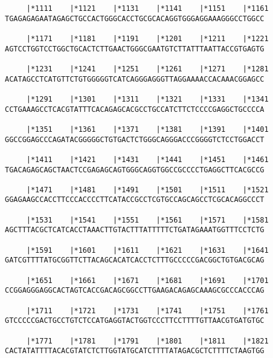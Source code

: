 \documentclass{article}
\begin{document}
\begin{Verbatim}
     |*1111    |*1121    |*1131    |*1141    |*1151    |*1161
TGAGAGAGAATAGAGCTGCCACTGGGCACCTGCGCACAGGTGGGAGGAAAGGGCCTGGCC
                                                            
     |*1171    |*1181    |*1191    |*1201    |*1211    |*1221
AGTCCTGGTCCTGGCTGCACTCTTGAACTGGGCGAATGTCTTATTTAATTACCGTGAGTG
                                                            
     |*1231    |*1241    |*1251    |*1261    |*1271    |*1281
ACATAGCCTCATGTTCTGTGGGGGTCATCAGGGAGGGTTAGGAAAACCACAAACGGAGCC
                                                            
     |*1291    |*1301    |*1311    |*1321    |*1331    |*1341
CCTGAAAGCCTCACGTATTTCACAGAGCACGCCTGCCATCTTCTCCCCGAGGCTGCCCCA
                                                            
     |*1351    |*1361    |*1371    |*1381    |*1391    |*1401
GGCCGGAGCCCAGATACGGGGGCTGTGACTCTGGGCAGGGACCCGGGGTCTCCTGGACCT
                                                            
     |*1411    |*1421    |*1431    |*1441    |*1451    |*1461
TGACAGAGCAGCTAACTCCGAGAGCAGTGGGCAGGTGGCCGCCCCTGAGGCTTCACGCCG
                                                            
     |*1471    |*1481    |*1491    |*1501    |*1511    |*1521
GGAGAAGCCACCTTCCCACCCCTTCATACCGCCTCGTGCCAGCAGCCTCGCACAGGCCCT
                                                            
     |*1531    |*1541    |*1551    |*1561    |*1571    |*1581
AGCTTTACGCTCATCACCTAAACTTGTACTTTATTTTTCTGATAGAAATGGTTTCCTCTG
                                                            
     |*1591    |*1601    |*1611    |*1621    |*1631    |*1641
GATCGTTTTATGCGGTTCTTACAGCACATCACCTCTTTGCCCCCGACGGCTGTGACGCAG
                                                            
     |*1651    |*1661    |*1671    |*1681    |*1691    |*1701
CCGGAGGGAGGCACTAGTCACCGACAGCGGCCTTGAAGACAGAGCAAAGCGCCCACCCAG
                                                            
     |*1711    |*1721    |*1731    |*1741    |*1751    |*1761
GTCCCCCGACTGCCTGTCTCCATGAGGTACTGGTCCCTTCCTTTTGTTAACGTGATGTGC
                                                            
     |*1771    |*1781    |*1791    |*1801    |*1811    |*1821
CACTATATTTTACACGTATCTCTTGGTATGCATCTTTTATAGACGCTCTTTTCTAAGTGG
                                                            

\end{Verbatim}
\end{document}
